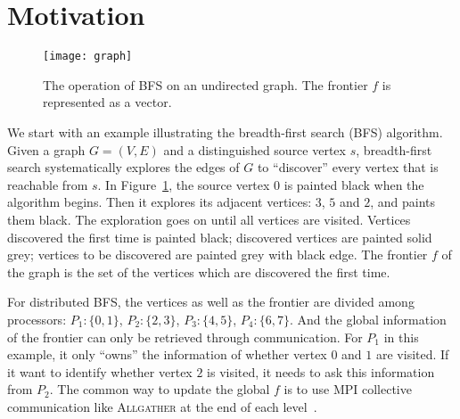 \documentclass[conference]{IEEEtran}
\begin{document}
\section{Motivation}
\label{sec:pre}

\begin{figure}[t]
  \centering
  \texttt{[image: graph]}
  \caption{The operation of BFS on an undirected graph. The frontier $f$ is
    represented as a vector.}
  \label{fig:bfs-example-all}
\end{figure}
We start with an example illustrating the breadth-first search (BFS)
algorithm. Given a graph $G = (V, E)$ and a distinguished source vertex $s$,
breadth-first search systematically explores the edges of $G$ to ``discover''
every vertex that is reachable from $s$. In Figure~\ref{fig:bfs-example-all},
the source vertex $0$ is painted black when the algorithm begins. Then it
explores its adjacent vertices: $3$, $5$ and $2$, and paints them black. The
exploration goes on until all vertices are visited. Vertices discovered the
first time is painted black; discovered vertices are painted solid grey;
vertices to be discovered are painted grey with black edge. The frontier $f$
of the graph is the set of the vertices which are discovered the first time.

For distributed BFS, the vertices as well as the frontier are divided among
processors: $P_1:\{0,1\}$, $P_2:\{2,3\}$, $P_3:\{4,5\}$, $P_4:\{6,7\}$. And
the global information of the frontier can only be retrieved through
communication. For $P_1$ in this example, it only ``owns'' the information of
whether vertex $0$ and $1$ are visited. If it want to identify whether vertex
$2$ is visited, it needs to ask this information from $P_2$. The common way to
update the global $f$ is to use MPI collective communication like
\textsc{Allgather} at the end of each
level~\cite{Yoo:2005,Buluc:2011,graph500}.
\end{document}
